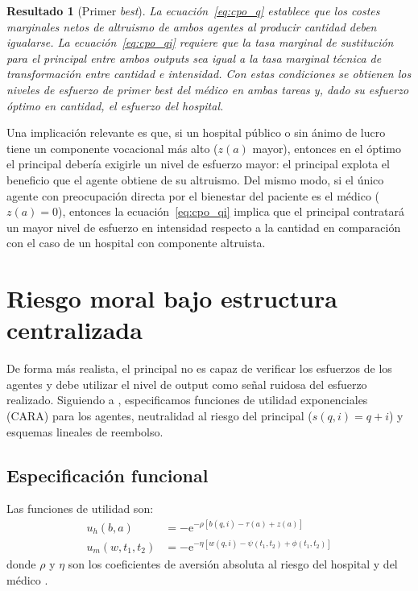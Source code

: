 \documentclass[12pt, a4paper, twoside, openright]{book}
\newcommand{\e}{\mathrm{e}}
\theoremstyle{plain}
\newtheorem{result}{Resultado}[chapter]
\theoremstyle{definition}
\theoremstyle{remark}
\begin{document}
\begin{result}[Primer \textit{best}]
La ecuación~\eqref{eq:cpo_q} establece que los costes marginales netos de altruismo de ambos agentes al producir cantidad deben igualarse. La ecuación~\eqref{eq:cpo_qi} requiere que la tasa marginal de sustitución para el principal entre ambos outputs sea igual a la tasa marginal técnica de transformación entre cantidad e intensidad. Con estas condiciones se obtienen los niveles de esfuerzo de primer \textit{best} del médico en ambas tareas y, dado su esfuerzo óptimo en cantidad, el esfuerzo del hospital.
\end{result}

Una implicación relevante es que, si un hospital público o sin ánimo de lucro tiene un componente vocacional más alto ($z(a)$ mayor), entonces en el óptimo el principal debería exigirle un nivel de esfuerzo mayor: el principal explota el beneficio que el agente obtiene de su altruismo. Del mismo modo, si el único agente con preocupación directa por el bienestar del paciente es el médico ($z(a)=0$), entonces la ecuación~\eqref{eq:cpo_qi} implica que el principal contratará un mayor nivel de esfuerzo en intensidad respecto a la cantidad en comparación con el caso de un hospital con componente altruista.


\section{Riesgo moral bajo estructura centralizada}
\label{sec:centralizada}

De forma más realista, el principal no es capaz de verificar los esfuerzos de los agentes y debe utilizar el nivel de output como señal ruidosa del esfuerzo realizado. Siguiendo a \citet{holmstrom1991}, especificamos funciones de utilidad exponenciales (CARA) para los agentes, neutralidad al riesgo del principal ($s(q,i)=q+i$) y esquemas lineales de reembolso.

\subsection{Especificación funcional}

Las funciones de utilidad son:
\begin{align}
  u_h(b,a) &= -\e^{-\rho[b(q,i)-\tau(a)+z(a)]} \label{eq:util_h_cara}\\
  u_m(w,t_1,t_2) &= -\e^{-\eta[w(q,i)-\psi(t_1,t_2)+\phi(t_1,t_2)]} \label{eq:util_m_cara}
\end{align}
donde $\rho$ y $\eta$ son los coeficientes de aversión absoluta al riesgo del hospital y del médico \citep{holmstrom1987}.
\end{document}
